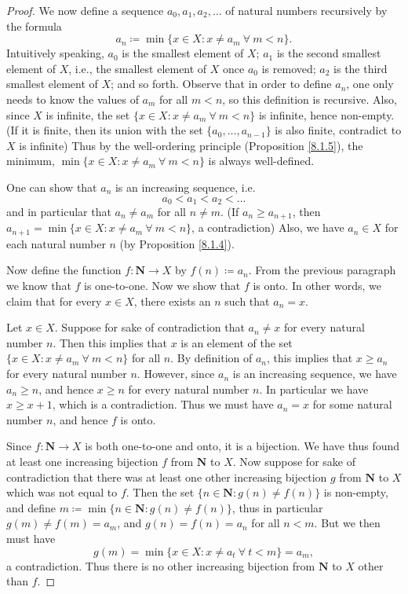 \begin{proof}
We now define a sequence \(a_0, a_1, a_2, \dots\) of natural numbers recursively by the formula
\[
    a_n \coloneqq \min\{x \in X : x \neq a_m \ \forall\ m < n\}.
\]
Intuitively speaking, \(a_0\) is the smallest element of \(X\);
\(a_1\) is the second smallest element of \(X\), i.e., the smallest element of \(X\) once \(a_0\) is removed;
\(a_2\) is the third smallest element of \(X\);
and so forth.
Observe that in order to define \(a_n\), one only needs to know the values of \(a_m\) for all \(m < n\), so this definition is recursive.
Also, since \(X\) is infinite, the set \(\{x \in X : x \neq a_m \ \forall\ m < n\}\) is infinite, hence non-empty.
(If it is finite, then its union with the set \(\{a_0, \dots, a_{n - 1}\}\) is also finite, contradict to \(X\) is infinite)
Thus by the well-ordering principle (Proposition \ref{8.1.5}), the minimum, \(\min\{x \in X : x \neq a_m \ \forall\ m < n\}\) is always well-defined.

One can show that \(a_n\) is an increasing sequence, i.e.
\[
    a_0 < a_1 < a_2 < \dots
\]
and in particular that \(a_n \neq a_m\) for all \(n \neq m\).
(If \(a_n \geq a_{n + 1}\), then \(a_{n + 1} = \min\{x \in X : x \neq a_m \ \forall\ m < n\}\), a contradiction)
Also, we have \(a_n \in X\) for each natural number \(n\) (by Proposition \ref{8.1.4}).

Now define the function \(f : \mathbf{N} \to X\) by \(f(n) \coloneqq a_n\).
From the previous paragraph we know that \(f\) is one-to-one.
Now we show that \(f\) is onto.
In other words, we claim that for every \(x \in X\), there exists an \(n\) such that \(a_n = x\).

Let \(x \in X\).
Suppose for sake of contradiction that \(a_n \neq x\) for every natural number \(n\).
Then this implies that \(x\) is an element of the set \(\{x \in X : x \neq a_m \ \forall\ m < n\}\) for all \(n\).
By definition of \(a_n\), this implies that \(x \geq a_n\) for every natural number \(n\).
However, since \(a_n\) is an increasing sequence, we have \(a_n \geq n\), and hence \(x \geq n\) for every natural number \(n\).
In particular we have \(x \geq x + 1\), which is a contradiction.
Thus we must have \(a_n = x\) for some natural number \(n\), and hence \(f\) is onto.

Since \(f : \mathbf{N} \to X\) is both one-to-one and onto, it is a bijection.
We have thus found at least one increasing bijection \(f\) from \(\mathbf{N}\) to \(X\).
Now suppose for sake of contradiction that there was at least one other increasing bijection \(g\) from \(\mathbf{N}\) to \(X\) which was not equal to \(f\).
Then the set \(\{n \in \mathbf{N} : g(n) \neq f(n)\}\) is non-empty, and define \(m \coloneqq \min\{n \in \mathbf{N} : g(n) \neq f(n)\}\), thus in particular \(g(m) \neq f(m) = a_m\), and \(g(n) = f(n) = a_n\) for all \(n < m\).
But we then must have
\[
    g(m) = \min\{x \in X : x \neq a_t \ \forall\ t < m\} = a_m,
\]
a contradiction.
Thus there is no other increasing bijection from \(\mathbf{N}\) to \(X\) other than \(f\).
\end{proof}

